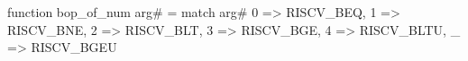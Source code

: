 function bop_of_num arg# = match arg# {
  0 => RISCV_BEQ,
  1 => RISCV_BNE,
  2 => RISCV_BLT,
  3 => RISCV_BGE,
  4 => RISCV_BLTU,
  _ => RISCV_BGEU
}

